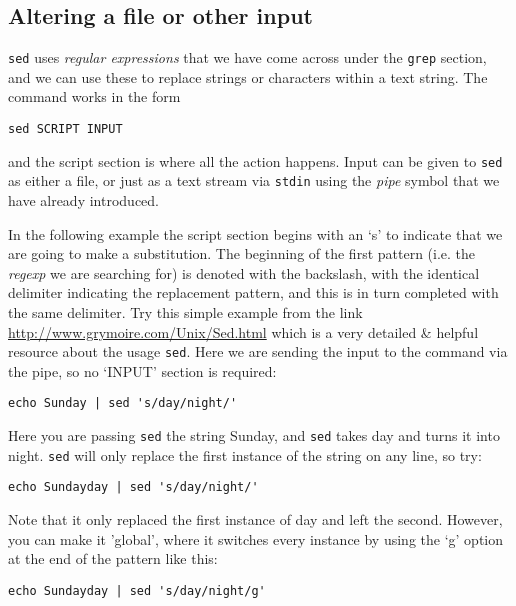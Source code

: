 \subsection*{Altering a file or other input}
\texttt{sed} uses \textit{regular expressions} that we have come across under the \texttt{grep} section, and we can use these to replace strings or characters within a text string.
The command works in the form 
\begin{lstlisting}[style=command_syntax]
sed SCRIPT INPUT
\end{lstlisting}
and the script section is where all the action happens.
Input can be given to \texttt{sed} as either a file, or just as a text stream via \texttt{stdin} using the \textit{pipe} symbol that we have already introduced.

\begin{steps}
In the following example the script section begins with an `s' to indicate that we are going to make a substitution.
The beginning of the first pattern (i.e. the \textit{regexp} we are searching for) is denoted with the backslash, with the identical delimiter indicating the replacement pattern, and this is in turn completed with the same delimiter.
Try this simple example from the link \url{http://www.grymoire.com/Unix/Sed.html} which is a very detailed \& helpful resource about the usage \texttt{sed}.
Here we are sending the input to the command via the pipe, so no `INPUT' section is required: \\
\end{steps}

\begin{lstlisting}
echo Sunday | sed 's/day/night/' 
\end{lstlisting}

Here you are passing \texttt{sed} the string Sunday, and \texttt{sed} takes day and turns it into night.  
\texttt{sed} will only replace the first instance of the string on any line, so try: \\

\begin{lstlisting}
echo Sundayday | sed 's/day/night/' 
\end{lstlisting}

Note that it only replaced the first instance of day and left the second.  
However, you can make it 'global', where it switches every instance by using the `g' option at the end of the pattern like this: \\

\begin{lstlisting}
echo Sundayday | sed 's/day/night/g' 
\end{lstlisting}

